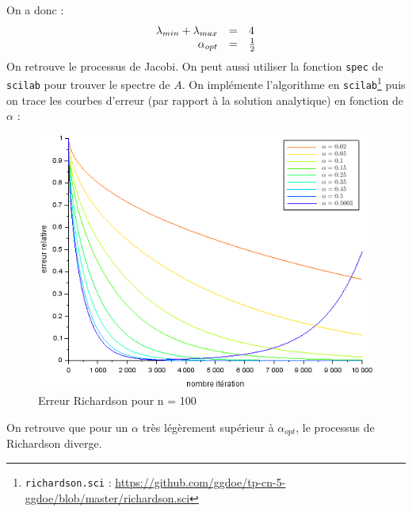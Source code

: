\documentclass{article}
\begin{document}
On a donc :
\[ 
	\begin{array}{r c l}
		\lambda_{min} + \lambda_{max} & = & 4 \\
	\alpha_{opt} & = & \frac{1}{2} \\
	\end{array}
\]
On retrouve le processus de Jacobi. On peut aussi utiliser la fonction \texttt{spec} de \texttt{scilab} pour trouver le spectre de $A$.
On implémente l'algorithme en \texttt{scilab}\footnote{\texttt{richardson.sci} : \href{https://github.com/ggdoe/tp-cn-5-ggdoe/blob/master/richardson.sci}{https://github.com/ggdoe/tp-cn-5-ggdoe/blob/master/richardson.sci}} puis on trace les courbes d'erreur (par rapport à la solution analytique) en fonction de $\alpha$ :
\begin{figure}[H]
\caption{Erreur Richardson pour n = 100}
\centering
\includegraphics[scale=0.70]{conv_richardson_n100}
\end{figure}
On retrouve que pour un $\alpha$ très légèrement supérieur à $\alpha_{opt}$, le processus de Richardson diverge.
\end{document}

